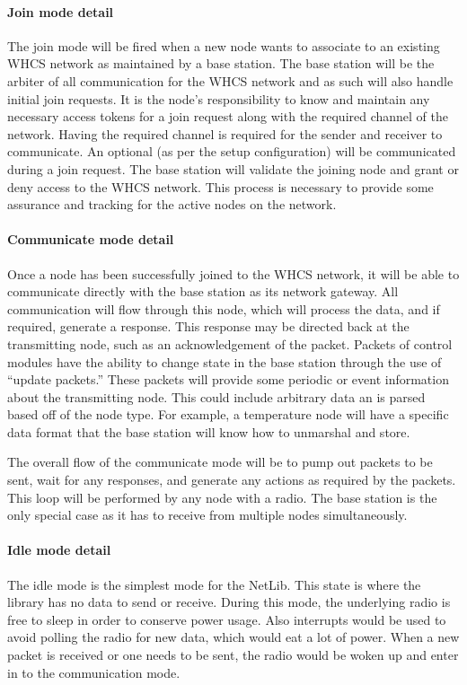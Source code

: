 
\paragraph{Join mode detail}
The join mode will be fired when a new node wants to associate to an existing
WHCS network as maintained by a base station. The base station will be the
arbiter of all communication for the WHCS network and as such will also handle
initial join requests. It is the node's responsibility to know and maintain any
necessary access tokens for a join request along with the required channel of
the network. Having the required channel is required for the sender and
receiver to communicate. An optional (as per the setup configuration) will be
communicated during a join request. The base station will validate the joining
node and grant or deny access to the WHCS network. This process is necessary to
provide some assurance and tracking for the active nodes on the network.

\paragraph{Communicate mode detail}
Once a node has been successfully joined to the WHCS network, it will be able
to communicate directly with the base station as its network gateway. All
communication will flow through this node, which will process the data, and if
required, generate a response. This response may be directed back at the
transmitting node, such as an acknowledgement of the packet. Packets of control
modules have the ability to change state in the base station through the use of
``update packets.'' These packets will provide some periodic or event
information about the transmitting node. This could include arbitrary data an
is parsed based off of the node type. For example, a temperature node will have
a specific data format that the base station will know how to unmarshal and
store.

The overall flow of the communicate mode will be to pump out packets to be
sent, wait for any responses, and generate any actions as required by the
packets. This loop will be performed by any node with a radio. The base station
is the only special case as it has to receive from multiple nodes
simultaneously.

\paragraph{Idle mode detail}
The idle mode is the simplest mode for the NetLib. This state is where the
library has no data to send or receive. During this mode, the underlying radio
is free to sleep in order to conserve power usage. Also interrupts would be
used to avoid polling the radio for new data, which would eat a lot of power.
When a new packet is received or one needs to be sent, the radio would be woken
up and enter in to the communication mode.

